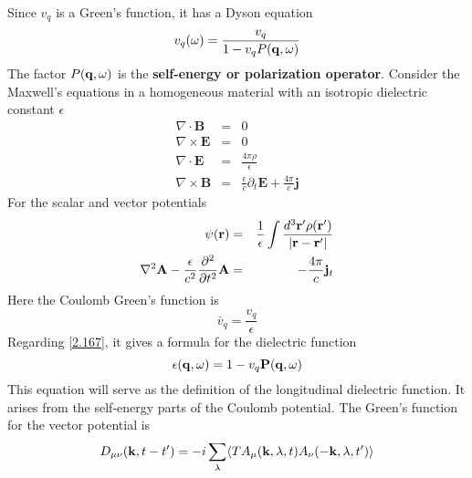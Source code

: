 Since $v_q$ is a Green's function, it has a Dyson equation
\begin{equation}
  v_q(\omega)= \frac{v_q}{1-v_q P(\mathbf{q},\omega)}  \label{2.167}
\end{equation}
The factor $P(\mathbf{q},\omega)$ is the \textbf{self-energy or polarization operator}.
Consider the Maxwell's equations in a homogeneous material with an isotropic dielectric constant $\epsilon$
\begin{eqnarray}
  \nabla \cdot \mathbf{B} &=& 0 \nonumber \\
  \nabla \times \mathbf{E} &=& 0 \nonumber \\
  \nabla \cdot \mathbf{E} &=& \frac{4\pi \rho}{\epsilon} \nonumber \\
  \nabla \times \mathbf{B} &=& \frac{\epsilon}{c} \partial_t \mathbf{E} + \frac{4\pi}{c} \mathbf{j} \label{2.168}
\end{eqnarray}
For the scalar and vector potentials
\begin{eqnarray}
  \psi(\mathbf{r}) &=& \frac{1}{\epsilon} \int \frac{d^3 \mathbf{r}' \rho(\mathbf{r}')}{\abs{\mathbf{r}-\mathbf{r}'}} \nonumber \\
  \nabla^2\mathbf{A} - \frac{\epsilon}{c^2} \frac{\partial^2}{\partial t^2} \mathbf{A} &=& -\frac{4\pi}{c} \mathbf{j}_t  \label{2.169}
\end{eqnarray}
Here the Coulomb Green's function is
\begin{equation}
  \bar{v}_q = \frac{v_q}{\epsilon}  \label{2.170}
\end{equation}
Regarding \eqref{2.167}, it gives a formula for the dielectric function
\begin{equation}
  \epsilon(\mathbf{q},\omega) = 1 - v_q \mathbf{P}(\mathbf{q},\omega)  \label{2.171}
\end{equation}
This equation will serve as the definition of the longitudinal dielectric function.
It arises from the self-energy parts of the Coulomb potential.
The Green's function for the vector potential is
\begin{equation}
  D_{\mu\nu}(\mathbf{k},t-t') = -i\sum_\lambda \langle T A_\mu(\mathbf{k},\lambda,t) A_\nu(-\mathbf{k},\lambda,t')\rangle  \label{2.172}
\end{equation}
